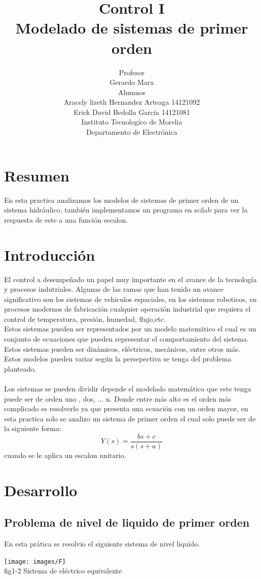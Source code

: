 \documentclass[12pt,a4paper]{IEEEtran}
\title{Control I \\ {\sc Modelado de sistemas de primer orden} }
\author{ Profesor  \\ Gerardo Marx \\ Alumnos \\ Aracely lizeth Hernandez Arteaga 14121092 \\ Erick David Bedolla García 14121081\\ Instituto Tecnologíco de Morelia \\ Departamento de Electrónica}
\begin{document}
\maketitle
\tableofcontents
\section{Resumen}
En esta practica analizamos los modelos de sistemas de primer orden de un sistema hidráulico, también implementamos un programa en scilab para ver la respuesta de este a una función escalon.
\section{Introducción}
El control a desempeñado un papel muy importante en el avance de la tecnología y procesos indutriales. Algunas de las ramas que han tenido un avance significativo son los sistemas de vehiculos espaciales, en los sistemas roboticos, en procesos modernos de fabricación cualquier operación industrial que requiera el control de temperatura, presión, humedad, flujo,etc.\cite{Ogata} \\
Estos sistemas pueden ser representados por un modelo matemático el cual es un conjunto de ecuaciones que pueden representar el comportamiento del sistema. Estos sistemas pueden ser dinámicos, eléctricos, mecánicos, entre otros más. \\
Estos modelos pueden variar según la persepectiva se tenga del problema planteado.\cite{Ogata}
\\ \\
Los sistemas se pueden dividir depende el modelado matemático que este tenga puede ser de orden uno , dos, ... n. Donde entre más alto es el orden más complicado es resolverlo ya que presenta una ecuación con un orden mayor, en esta practica solo se analizo un sistema de primer orden el cual solo puede ser de la siguiente forma:
$$Y(s) = \frac{bs + c}{s(s + a)}$$ cuando se le aplica un escalon unitario.
\section{Desarrollo}
\subsection{Problema de nivel de liquido de primer orden}
En esta prática se resolvio el siguiente sistema de nivel liquido.


\begin{center}
	\texttt{[image: images/F]}\\
	{fig1-2 Sistema de eléctrico equivalente}
\end{center}
\end{document}
